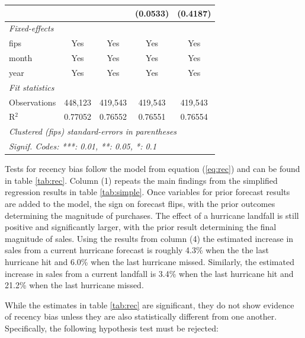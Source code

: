 \documentclass{article}
\begin{document}
\begin{table}[htbp]
\begin{tabular}{lcccc}
                                              &                &                 & (0.0533)        & (0.4187)\\   
      \midrule
      \emph{Fixed-effects}\\
      fips                                    & Yes            & Yes             & Yes             & Yes\\  
      month                                   & Yes            & Yes             & Yes             & Yes\\  
      year                                    & Yes            & Yes             & Yes             & Yes\\  
      \midrule
      \emph{Fit statistics}\\
      Observations                            & 448,123        & 419,543         & 419,543         & 419,543\\  
      R$^2$                                   & 0.77052        & 0.76552         & 0.76551         & 0.76554\\  
      \midrule \midrule
      \multicolumn{5}{l}{\emph{Clustered (fips) standard-errors in parentheses}}\\
      \multicolumn{5}{l}{\emph{Signif. Codes: ***: 0.01, **: 0.05, *: 0.1}}\\
   \end{tabular}
\end{table}


Tests for recency bias follow the model from equation (\ref{eq:rec}) and can be found in table \ref{tab:rec}. Column (1) repeats the main findings from the simplified regression results in table \ref{tab:simple}. Once variables for prior forecast results are added to the model, the sign on forecast flips, with the prior outcomes determining the magnitude of purchases. The effect of a hurricane landfall is still positive and significantly larger, with the prior result determining the final magnitude of sales. Using the results from column (4) the estimated increase in sales from a current hurricane forecast is roughly 4.3\% when the the last hurricane hit and 6.0\% when the last hurricane missed. Similarly, the estimated increase in sales from a current landfall is 3.4\% when the last hurricane hit and 21.2\% when the last hurricane missed. 

While the estimates in table \ref{tab:rec} are significant, they do not show evidence of recency bias unless they are also statistically different from one another. Specifically, the following hypothesis test must be rejected:
\end{document}
